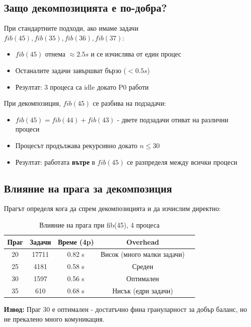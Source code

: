 \documentclass[12pt,a4paper]{article}
\begin{document}
\subsection{Защо декомпозицията е по-добра?}

При стандартните подходи, ако имаме задачи $fib(45), fib(35), fib(36), fib(37)$:
\begin{itemize}
    \item $fib(45)$ отнема $\approx 2.5s$ и се изчислява от един процес
    \item Останалите задачи завършват бързо ($< 0.5s$)
    \item Резултат: 3 процеса са idle докато P0 работи
\end{itemize}

При декомпозиция, $fib(45)$ се разбива на подзадачи:
\begin{itemize}
    \item $fib(45) = fib(44) + fib(43)$ - двете подзадачи отиват на различни процеси
    \item Процесът продължава рекурсивно докато $n \leq 30$
    \item Резултат: работата \textbf{вътре} в $fib(45)$ се разпределя между всички процеси
\end{itemize}

\subsection{Влияние на прага за декомпозиция}

Прагът определя кога да спрем декомпозицията и да изчислим директно:

\begin{table}[H]
\centering
\begin{tabular}{ccccc}
\toprule
\textbf{Праг} & \textbf{Задачи} & \textbf{Време (4p)} & \textbf{Overhead} \\
\midrule
20 & 17711 & 0.82 s & Висок (много малки задачи) \\
25 & 4181 & 0.58 s & Среден \\
30 & 1597 & 0.56 s & Оптимален \\
35 & 610 & 0.68 s & Нисък (едри задачи) \\
\bottomrule
\end{tabular}
\caption{Влияние на прага при fib(45), 4 процеса}
\end{table}

\textbf{Извод:} Праг 30 е оптимален - достатъчно фина грануларност за добър баланс, но не прекалено много комуникация.
\end{document}

